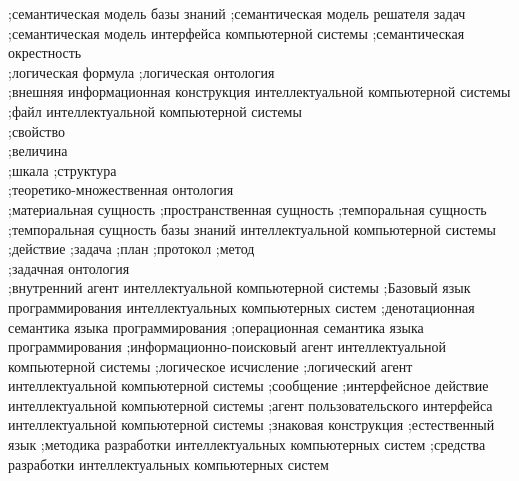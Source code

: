 {	
;семантическая модель базы знаний
;семантическая модель решателя задач
;семантическая модель интерфейса компьютерной системы
;семантическая окрестность\\
;логическая формула
;логическая онтология\\
;внешняя информационная конструкция интеллектуальной компьютерной системы
;файл интеллектуальной компьютерной системы\\
;свойство\\
;величина\\
;шкала
;структура\\
;теоретико-множественная онтология\\
;материальная сущность
;пространственная сущность
;темпоральная сущность\\
;темпоральная сущность базы знаний интеллектуальной компьютерной системы\\
;действие
;задача
;план
;протокол
;метод\\
;задачная онтология\\
;внутренний агент интеллектуальной компьютерной системы
;Базовый язык программирования интеллектуальных компьютерных систем
;денотационная семантика языка программирования
;операционная семантика языка программирования
;информационно-поисковый агент интеллектуальной компьютерной системы
;логическое исчисление
;логический агент интеллектуальной компьютерной системы
;сообщение
;интерфейсное действие интеллектуальной компьютерной системы
;агент пользовательского интерфейса интеллектуальной компьютерной системы
;знаковая конструкция
;естественный язык
;методика разработки интеллектуальных компьютерных систем
;средства разработки интеллектуальных компьютерных систем
}
